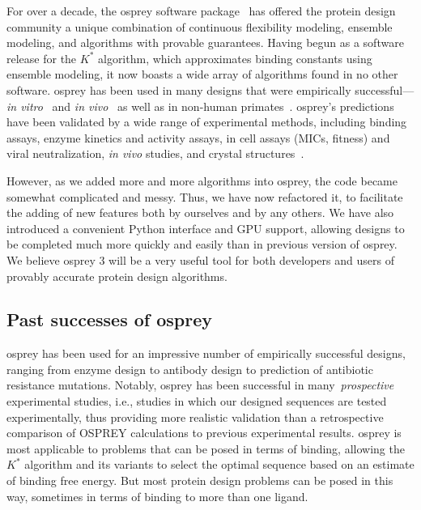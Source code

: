 For over a decade, the {\sc osprey} software package~\cite{OSPREY,minDEE,OSPREY_MIE} has offered the protein design community a unique combination of continuous flexibility modeling, ensemble modeling, and algorithms with provable guarantees.  Having begun as a software release for the $K^*$ algorithm, which approximates binding constants using ensemble modeling, it now boasts a wide array of algorithms found in no other software.  {\sc osprey} has been used in many designs that were empirically successful---\textit{in vitro}~\cite{VRC07_enhance,CFTR,runx1_cbfb,GrsA-LeuA,DHFR-PNAS,GrsA-TyrA,specific_probes} and \textit{in vivo}~\cite{VRC07_enhance,CFTR,runx1_cbfb,DHFR-PNAS} as well as in non-human primates~\cite{VRC07_enhance}.  {\sc osprey}'s predictions have been validated by a wide range of experimental methods, including binding assays, enzyme kinetics and activity assays, in cell assays (MICs, fitness) and viral neutralization, {\em in vivo} studies, and crystal structures~\cite{DHFR-PNAS2, VRC07_enhance}.    

However, as we added more and more algorithms into {\sc osprey}, the code became somewhat complicated and messy.  Thus, we have now refactored it, to facilitate the adding of new features both by ourselves and by any others.  We have also introduced a convenient Python interface and GPU support, allowing designs to be completed much more quickly and easily than in previous version of {\sc osprey}.  We believe {\sc osprey} 3 will be a very useful tool for both developers and users of provably accurate protein design algorithms.  

\subsection{Past successes of {\sc osprey}}

{\sc osprey} has been used for an impressive number of empirically successful designs, ranging from enzyme design to antibody design to prediction of antibiotic resistance mutations.  Notably, {\sc osprey} has been successful in many~\textit{prospective} experimental studies, i.e., studies in which our designed sequences are tested experimentally, thus providing more realistic validation than a retrospective comparison of OSPREY calculations to previous experimental results.  {\sc osprey} is most applicable to problems that can be posed in terms of binding, allowing the $K^*$ algorithm and its variants to select the optimal sequence based on an estimate of binding free energy.  But most protein design problems can be posed in this way, sometimes in terms of binding to more than one ligand.  

